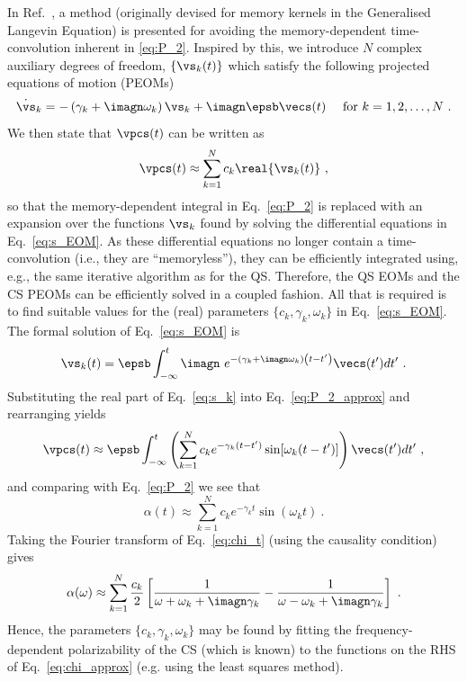 In Ref.~\cite{stella_generalized_2014}, a method (originally devised for memory
kernels in the Generalised Langevin Equation) is presented for avoiding the
memory-dependent time-convolution inherent in \cref{eq:P_2}. Inspired by this,
we introduce $N$ complex auxiliary degrees of freedom, $\{\vs_k(t)\}$ which
satisfy the following projected equations of motion (PEOMs)
%
\begin{equation}\label{eq:s_EOM}
    \dot{\vs}_k = -\left( \gamma_k + \imagn\omega_k \right)\vs_k + \imagn\epsb
    \vecs(t)\ \quad \text{for }k=1,2,\ldots,N \
    .
\end{equation}
%
We then state that $\vpcs(t)$ can be written as
%
\begin{equation}\label{eq:P_2_approx}
    \vpcs(t) \approx \sum_{k=1}^{N} c_k \real{\vs_k(t)} \ ,
\end{equation}
%
so that the memory-dependent integral in Eq.~\eqref{eq:P_2} is replaced with an
expansion over the functions $\vs_k$ found by solving the differential
equations in Eq.~\eqref{eq:s_EOM}. As these differential equations no longer
contain a time-convolution (i.e., they are ``memoryless''), they can be
efficiently integrated using, e.g., the same iterative algorithm as for the QS. 
Therefore, the QS EOMs and the CS PEOMs can be efficiently solved in a coupled
fashion.
All that
is required is to find suitable values for the (real) parameters $\{c_k,
\gamma_k, \omega_k\}$ in Eq.~\eqref{eq:s_EOM}.
The formal solution of Eq.~\eqref{eq:s_EOM} is
%
\begin{equation}
    \vs_k(t) = \epsb \int_{-\infty}^{t}\imagn\ e^{-\left( \gamma_k + \imagn\omega_k
    \right)\left( t-t' \right)} \vecs (t') dt' \ .
    \label{eq:s_k}
\end{equation}
%
Substituting the real part of Eq.~\eqref{eq:s_k} into Eq.~\eqref{eq:P_2_approx} and
rearranging yields
%
\begin{equation}
    \vpcs(t) \approx \epsb
    \int_{-\infty}^{t} 
    \left( 
        \sum_{k=1}^{N} c_k e^{-\gamma_k (t-t')}\sin[\omega_k(t-t')]
    \right) 
    \vecs(t') dt' \ ,
\end{equation}
%
and comparing with Eq.~\eqref{eq:P_2} we see that
%
\begin{equation}
    \alpha(t) \approx 
        \sum_{k=1}^{N} c_k e^{-\gamma_k t}\sin(\omega_k t) \ .
    \label{eq:chi_t}
\end{equation}
%
Taking the Fourier transform of
Eq.~\eqref{eq:chi_t} (using the causality condition) gives
%
\begin{equation}
    \alpha(\omega) \approx \sum_{k=1}^{N}\frac{c_k}{2}
    \left[ \frac{1}{\omega+\omega_k +\imagn\gamma_k}
    -\frac{1}{ \omega-\omega_k +\imagn\gamma_k}\right] \ .
    \label{eq:chi_approx}
\end{equation}
%
Hence, the parameters $\{c_k,\gamma_k,\omega_k\}$ may be found by fitting
the frequency-dependent polarizability of the CS (which is known)
to the functions on the RHS of Eq.~\eqref{eq:chi_approx}
(e.g. using the least squares method).
